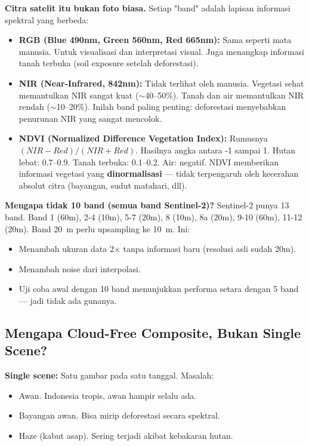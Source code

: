 \documentclass[10pt,a4paper,onecolumn]{article}
\begin{document}
\textbf{Citra satelit itu bukan foto biasa.} Setiap "band" adalah
lapisan informasi spektral yang berbeda:
\begin{itemize}[nosep]
    \item \textbf{RGB (Blue 490nm, Green 560nm, Red 665nm):} Sama
          seperti mata manusia. Untuk visualisasi dan interpretasi
          visual. Juga menangkap informasi tanah terbuka (soil
          exposure setelah deforestasi).
    \item \textbf{NIR (Near-Infrared, 842nm):} Tidak terlihat oleh
          manusia. Vegetasi sehat memantulkan NIR sangat kuat
          ($\sim$40--50\%). Tanah dan air memantulkan NIR rendah
          ($\sim$10--20\%). Inilah band paling penting: deforestasi
          menyebabkan penurunan NIR yang sangat mencolok.
    \item \textbf{NDVI (Normalized Difference Vegetation Index):}
          Rumusnya $(NIR - Red) / (NIR + Red)$. Hasilnya angka antara
          -1 sampai 1. Hutan lebat: 0.7--0.9. Tanah terbuka: 0.1--0.2.
          Air: negatif. NDVI memberikan informasi vegetasi yang
          \textbf{dinormalisasi} — tidak terpengaruh oleh kecerahan
          absolut citra (bayangan, sudut matahari, dll).
\end{itemize}

\textbf{Mengapa tidak 10 band (semua band Sentinel-2)?}
Sentinel-2 punya 13 band. Band 1 (60m), 2-4 (10m), 5-7 (20m),
8 (10m), 8a (20m), 9-10 (60m), 11-12 (20m). Band 20~m perlu
upsampling ke 10~m. Ini:
\begin{itemize}[nosep]
    \item Menambah ukuran data 2$\times$ tanpa informasi baru (resolusi
          asli sudah 20m).
    \item Menambah noise dari interpolasi.
    \item Uji coba awal dengan 10 band menunjukkan performa setara
          dengan 5 band — jadi tidak ada gunanya.
\end{itemize}

\subsection{Mengapa Cloud-Free Composite, Bukan Single Scene?}

\textbf{Single scene:} Satu gambar pada satu tanggal. Masalah:
\begin{itemize}[nosep]
    \item Awan. Indonesia tropis, awan hampir selalu ada.
    \item Bayangan awan. Bisa mirip deforestasi secara spektral.
    \item Haze (kabut asap). Sering terjadi akibat kebakaran hutan.
\end{itemize}
\end{document}

